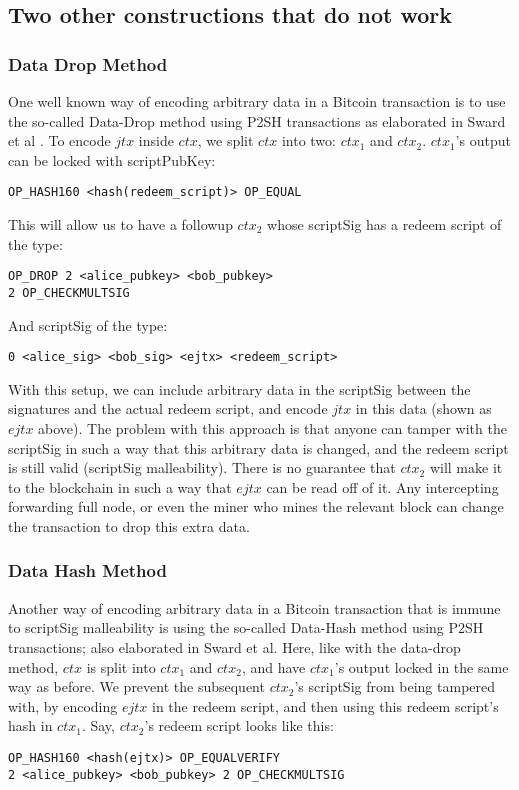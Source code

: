 \subsection{Two other constructions that do not work}

\subsubsection{Data Drop Method}
One well known way of encoding arbitrary data in a Bitcoin transaction is to use the so-called Data-Drop method using P2SH transactions as elaborated in Sward et al \cite{sward2018data}. To encode $\mathit{jtx}$ inside $\mathit{ctx}$, we split $\mathit{ctx}$ into two: $\mathit{ctx_1}$ and $\mathit{ctx_2}$. $\mathit{ctx_1}$'s output can be locked with scriptPubKey:
\begin{verbatim}
OP_HASH160 <hash(redeem_script)> OP_EQUAL
\end{verbatim}

This will allow us to have a followup $\mathit{ctx_2}$ whose scriptSig has a redeem script of the type:
\begin{verbatim}
OP_DROP 2 <alice_pubkey> <bob_pubkey>
2 OP_CHECKMULTSIG
\end{verbatim}

And scriptSig of the type:
\noindent
\begin{verbatim}
0 <alice_sig> <bob_sig> <ejtx> <redeem_script>
\end{verbatim}

With this setup, we can include arbitrary data in the scriptSig between the signatures and the actual redeem script, and encode $\mathit{jtx}$ in this data (shown as $\mathit{ejtx}$ above). The problem with this approach is that anyone can tamper with the scriptSig in such a way that this arbitrary data is changed, and the redeem script is still valid (scriptSig malleability). There is no guarantee that $\mathit{ctx_2}$ will make it to the blockchain in such a way that $\mathit{ejtx}$ can be read off of it. Any intercepting forwarding full node, or even the miner who mines the relevant block can change the transaction to drop this extra data.

\subsubsection{Data Hash Method}
\sloppy
Another way of encoding arbitrary data in a Bitcoin transaction that is immune to scriptSig malleability is using the so-called Data-Hash method using P2SH transactions; also elaborated in Sward et al\cite{sward2018data}. Here, like with the data-drop method, $\mathit{ctx}$ is split into $\mathit{ctx_1}$ and $\mathit{ctx_2}$, and have $\mathit{ctx_1}$'s output locked in the same way as before. We prevent the subsequent $\mathit{ctx_2}$'s scriptSig from being tampered with, by encoding $\mathit{ejtx}$ in the redeem script, and then using this redeem script's hash in $\mathit{ctx_1}$. Say, $\mathit{ctx_2}$'s redeem script looks like this: 
\begin{verbatim}
OP_HASH160 <hash(ejtx)> OP_EQUALVERIFY
2 <alice_pubkey> <bob_pubkey> 2 OP_CHECKMULTSIG
\end{verbatim}


